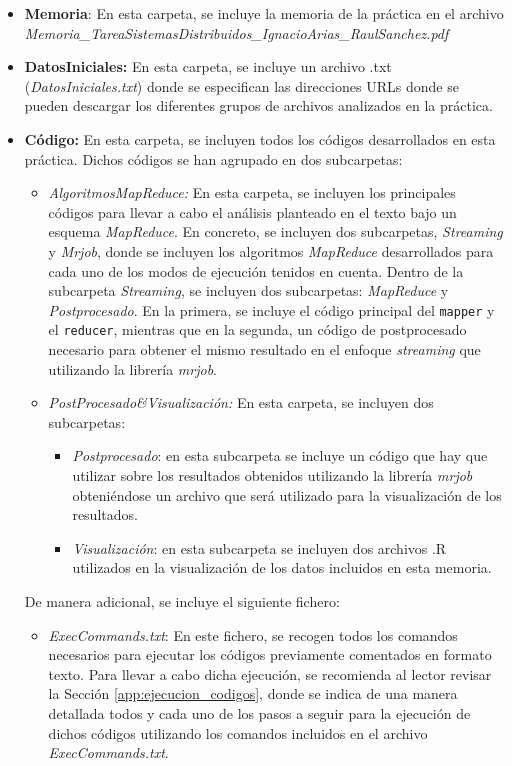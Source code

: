 \documentclass[10pt, spanish]{article}
\begin{document}
\begin{appendices}
\begin{itemize}
\item \textbf{Memoria}: En esta carpeta, se incluye la memoria de la práctica en el archivo \\
\textit{Memoria\_TareaSistemasDistribuidos\_IgnacioArias\_RaulSanchez.pdf}
\item \textbf{DatosIniciales:} En esta carpeta, se incluye un archivo .txt (\textit{DatosIniciales.txt}) donde se especifican las direcciones URLs donde se pueden descargar los diferentes grupos de archivos analizados en la práctica.
\item \textbf{Código:} En esta carpeta, se incluyen todos los códigos desarrollados en esta práctica. Dichos códigos se han agrupado en dos subcarpetas:
\begin{itemize}
\item \textit{AlgoritmosMapReduce:} En esta carpeta, se incluyen los principales códigos para llevar a cabo el análisis planteado en el texto bajo un esquema \textit{MapReduce}. En concreto, se incluyen dos subcarpetas, \textit{Streaming} y \textit{Mrjob}, donde se incluyen los algoritmos \textit{MapReduce} desarrollados para cada uno de los modos de ejecución tenidos en cuenta. Dentro de la subcarpeta \textit{Streaming}, se incluyen dos subcarpetas: \textit{MapReduce} y \textit{Postprocesado}. En la primera, se incluye el código principal del \texttt{mapper} y el \texttt{reducer}, mientras que en la segunda, un código de postprocesado necesario para obtener el mismo resultado en el enfoque \textit{streaming} que utilizando la librería \textit{mrjob}.
\item \textit{PostProcesado\&Visualización:} En esta carpeta, se incluyen dos subcarpetas:
\begin{itemize}
\item \textit{Postprocesado}: en esta subcarpeta se incluye un código que hay que utilizar sobre los resultados obtenidos utilizando la librería \textit{mrjob} obteniéndose un archivo que será utilizado para la visualización de los resultados.
\item \textit{Visualización}: en esta subcarpeta se incluyen dos archivos .R utilizados en la visualización de los datos incluidos en esta memoria.
\end{itemize}
\end{itemize}

De manera adicional, se incluye el siguiente fichero:

\begin{itemize}
\item \textit{ExecCommands.txt}: En este fichero, se recogen todos los comandos necesarios para ejecutar los códigos previamente comentados en formato texto. Para llevar a cabo dicha ejecución, se recomienda al lector revisar la Sección \ref{app:ejecucion_codigos}, donde se indica de una manera detallada todos y cada uno de los pasos a seguir para la ejecución de dichos códigos utilizando los comandos incluidos en el archivo \textit{ExecCommands.txt}.
\end{itemize}


\end{itemize}
\end{appendices}
\end{document}
